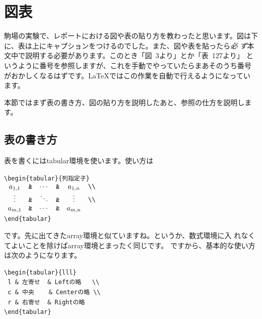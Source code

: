 
\section{図表}
駒場の実験で、レポートにおける図や表の貼り方を教わったと思います。図は下
に、表は上にキャプションをつけるのでした。また、図や表を貼ったら\emph{必
ず}本文中で説明する必要があります。このとき「図~3より」とか「表~127より」
というように番号を参照しますが、これを手動でやっていたらまあそのうち番号
がおかしくなるはずです。{\LaTeX}ではこの作業を自動で行えるようになってい
ます。

本節ではまず表の書き方、図の貼り方を説明したあと、参照の仕方を説明します。

\subsection{表の書き方}\label{sub:tabular}
表を書くにはtabular環境を使います。使い方は
\begin{screen}
\verb+\begin{tabular}{列指定子}+ \\
$\begin{array}{cccccc}
 a_{1,1} & \verb+&+ & \cdots & \verb+&+ & a_{1,n} & \verb+\\+ \\
 \vdots  & \verb+&+ & \ddots & \verb+&+ & \vdots  & \verb+\\+ \\
 a_{m,1} & \verb+&+ & \cdots & \verb+&+ & a_{m,n} &
\end{array}$\\
\verb+\end{tabular}+
\end{screen}
です。先に出てきたarray環境と似ていますね。というか、数式環境に入
れなくてよいことを除けばarray環境とまったく同じです。
ですから、基本的な使い方は次のようになります。\\
\begin{minipage}[c]{.50\textwidth}
\begin{screen}
\small
\begin{verbatim}
\begin{tabular}{lll}
 l & 左寄せ  & Leftの略   \\
 c & 中央    & Centerの略 \\
 r & 右寄せ  & Rightの略
\end{tabular}
\end{verbatim}
\end{screen}
\end{minipage}%
